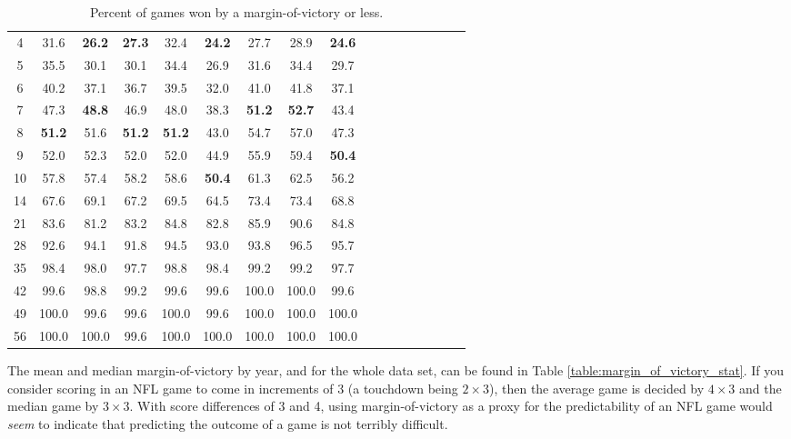 \documentclass[11pt]{article}
\begin{document}
\begin{table}[!htb]
\begin{center}
\begin{tabular}{|c|c|c|c|c|c|c|c|c|c|c|c|c|c|c|c|c|}
4 & 31.6 & \textbf{26.2} & \textbf{27.3} & 32.4 & \textbf{24.2} & 27.7 & 28.9 & \textbf{24.6}\\
5 & 35.5 & 30.1 & 30.1 & 34.4 & 26.9 & 31.6 & 34.4 & 29.7\\
6 & 40.2 & 37.1 & 36.7 & 39.5 & 32.0 & 41.0 & 41.8 & 37.1\\
7 & 47.3 & \textbf{48.8} & 46.9 & 48.0 & 38.3 & \textbf{51.2} & \textbf{52.7} & 43.4\\
8 & \textbf{51.2} & 51.6 & \textbf{51.2} & \textbf{51.2} & 43.0 & 54.7 & 57.0 & 47.3\\
9 & 52.0 & 52.3 & 52.0 & 52.0 & 44.9 & 55.9 & 59.4 & \textbf{50.4}\\
10 & 57.8 & 57.4 & 58.2 & 58.6 & \textbf{50.4} & 61.3 & 62.5 & 56.2\\
14 & 67.6 & 69.1 & 67.2 & 69.5 & 64.5 & 73.4 & 73.4 & 68.8\\
21 & 83.6 & 81.2 & 83.2 & 84.8 & 82.8 & 85.9 & 90.6 & 84.8\\
28 & 92.6 & 94.1 & 91.8 & 94.5 & 93.0 & 93.8 & 96.5 & 95.7\\
35 & 98.4 & 98.0 & 97.7 & 98.8 & 98.4 & 99.2 & 99.2 & 97.7\\
42 & 99.6 & 98.8 & 99.2 & 99.6 & 99.6 & 100.0 & 100.0 & 99.6\\
49 & 100.0 & 99.6 & 99.6 & 100.0 & 99.6 & 100.0 & 100.0 & 100.0\\
56 & 100.0 & 100.0 & 99.6 & 100.0 & 100.0 & 100.0 & 100.0 & 100.0\\
\hline
\end{tabular}
\caption{Percent of games won by a margin-of-victory or less.}\label{table:margin_of_victory}
\end{center}
\end{table}

The mean and median margin-of-victory by year, and for the whole data set, can be found in Table \ref{table:margin_of_victory_stat}. If you consider scoring in an NFL game to come in increments of 3 (a touchdown being $2 \times 3$), then the average game is decided by $4 \times 3$ and the median game by $3 \times 3$. With score differences of 3 and 4, using margin-of-victory as a proxy for the predictability of an NFL game would \emph{seem} to indicate that predicting the outcome of a game is not terribly difficult.
\end{document}
